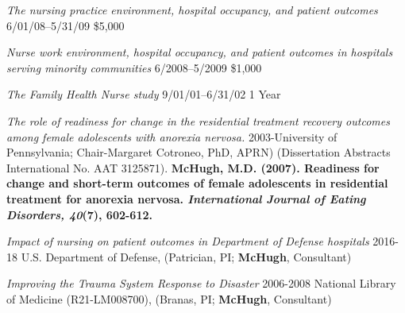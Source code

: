 \documentclass[10pt,]{article}
\begin{document}
{{{{{{{{{{{{{{\textit {The nursing practice environment, hospital occupancy, and patient outcomes} \hfill 6/01/08--5/31/09 \newline
{}	\hfill \$5,000

\textit {Nurse work environment, hospital occupancy, and patient outcomes in hospitals serving minority communities} \hfill 6/2008--5/2009 \newline
{}	\hfill \$1,000

\textit {The Family Health Nurse study} \hfill 9/01/01--6/31/02 \newline
{} \hfill 1 Year

\vspace{4mm}


{\textit {The role of readiness for change in the residential treatment recovery outcomes among female adolescents with anorexia nervosa.}} 
2003-University of Pennsylvania; Chair-Margaret Cotroneo, PhD, APRN) (Dissertation Abstracts International No. AAT 3125871). {\textbf {\small {McHugh, M.D. (2007). Readiness for change and short-term outcomes of female adolescents in residential treatment for anorexia nervosa. {\textit {International Journal of Eating Disorders, 40}}(7), 602-612.}}}

\vspace{4mm}


{\textit {Impact of nursing on patient outcomes in Department of Defense hospitals}} \hfill 2016-18 \newline
\hspace*{0.5cm}U.S. Department of Defense, (Patrician, PI; {\textbf {McHugh}}, Consultant)

{\textit {Improving the Trauma System Response to Disaster}} \hfill 2006-2008 \newline
\hspace*{0.5cm}National Library of Medicine (R21-LM008700), (Branas, PI; {\textbf {McHugh}}, Consultant)

}}}}}}}}}}}}}}
\end{document}
